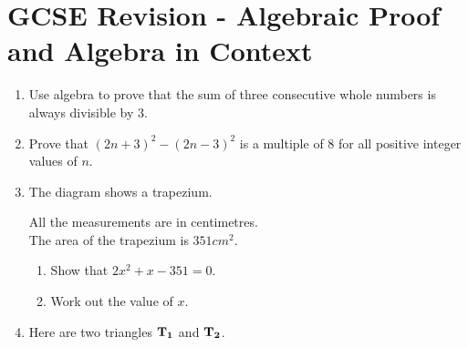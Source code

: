 
\chapter{GCSE Revision - Algebraic Proof and Algebra in Context}

\begin{enumerate}
  \item Use algebra to prove that the sum of three consecutive whole numbers is always divisible by $3$.\strch
  \item Prove that $(2n + 3)^2 - (2n - 3)^2$ is a multiple of $8$ for all positive integer values of $n$.\strch
  \item The diagram shows a trapezium.
  \begin{figure}[H]
    \centering
  \end{figure}
  All the measurements are in centimetres.\\
  The area of the trapezium is $351 cm^2$.
  \newpage
  \begin{enumerate}
    \item Show that $2x^2 + x - 351 = 0$.\strch
    \item Work out the value of $x$.\strch
  \end{enumerate}
  \item Here are two triangles $\vb{T_1}$ and $\vb{T_2}$.
  \begin{figure}[H]
    \centering
\end{figure}
\end{enumerate}
